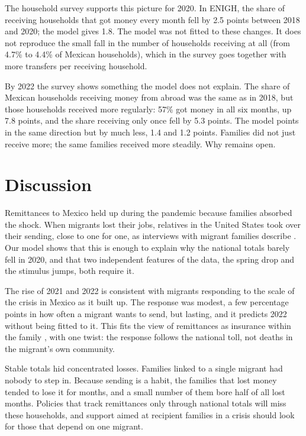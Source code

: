 \documentclass[11pt]{article}
\begin{document}
The household survey supports this picture for 2020. In ENIGH, the share of receiving households that got money every month fell by 2.5 points between 2018 and 2020; the model gives 1.8. The model was not fitted to these changes. It does not reproduce the small fall in the number of households receiving at all (from 4.7\% to 4.4\% of Mexican households), which in the survey goes together with more transfers per receiving household.

By 2022 the survey shows something the model does not explain. The share of Mexican households receiving money from abroad was the same as in 2018, but those households received more regularly: 57\% got money in all six months, up 7.8 points, and the share receiving only once fell by 5.3 points. The model points in the same direction but by much less, 1.4 and 1.2 points. Families did not just receive more; the same families received more steadily. Why remains open.

\section{Discussion}

Remittances to Mexico held up during the pandemic because families absorbed the shock. When migrants lost their jobs, relatives in the United States took over their sending, close to one for one, as interviews with migrant families describe \cite{ventura2024resilient}. Our model shows that this is enough to explain why the national totals barely fell in 2020, and that two independent features of the data, the spring drop and the stimulus jumps, both require it.

The rise of 2021 and 2022 is consistent with migrants responding to the scale of the crisis in Mexico as it built up. The response was modest, a few percentage points in how often a migrant wants to send, but lasting, and it predicts 2022 without being fitted to it. This fits the view of remittances as insurance within the family \cite{amuedo2006insurance, sana2005household}, with one twist: the response follows the national toll, not deaths in the migrant's own community.

Stable totals hid concentrated losses. Families linked to a single migrant had nobody to step in. Because sending is a habit, the families that lost money tended to lose it for months, and a small number of them bore half of all lost months. Policies that track remittances only through national totals will miss these households, and support aimed at recipient families in a crisis should look for those that depend on one migrant.
\end{document}
